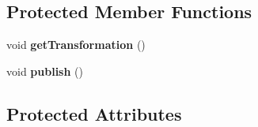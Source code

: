 \subsection*{Protected Member Functions}
\begin{DoxyCompactItemize}
\item 
void {\bfseries get\+Transformation} ()\hypertarget{classController_a5f86e07f526598b251e345a908923950}{}\label{classController_a5f86e07f526598b251e345a908923950}

\item 
void {\bfseries publish} ()\hypertarget{classController_ae6859e3a43be2fa31cb82ace3954e746}{}\label{classController_ae6859e3a43be2fa31cb82ace3954e746}

\end{DoxyCompactItemize}
\subsection*{Protected Attributes}
